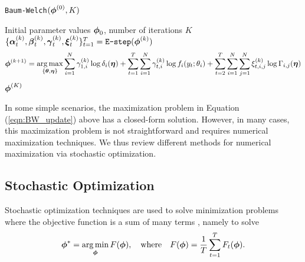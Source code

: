 %
%
%
\begin{algorithm}
\caption{\texttt{Baum-Welch}$(\boldsymbol{\phi}^{(0)},K)$}\label{alg:EM}
\begin{algorithmic}[1]
\Require Initial parameter values $\boldsymbol{\phi}_0$, number of iterations $K$
    \State $\{\boldsymbol{\alpha}_{t}^{(k)},\boldsymbol{\beta}_{t}^{(k)},\boldsymbol{\gamma}_{t}^{(k)},\boldsymbol{\xi}_{t}^{(k)}\}_{t=1}^T = \texttt{E-step}(\boldsymbol{\phi}^{(k)})$  
    \State {} $$\boldsymbol{\phi}^{(k+1)} = \operatorname*{arg\,max}_{\{\boldsymbol{\theta},\boldsymbol{\eta}\}} \sum_{i=1}^N \gamma_{1,i}^{(k)} \log \delta_{i}(\boldsymbol{\eta}) + \sum_{t = 1}^T \sum_{i=1}^N \gamma_{t,i}^{(k)} \log f_{i}(y_t;\theta_{i}) + \sum_{t=2}^{T} \sum_{i=1}^N \sum_{j=1}^N \xi_{t,i,j}^{(k)} \log \Gamma_{i,j}(\boldsymbol{\eta})$$
\EndFor
\State \Return $\boldsymbol{\phi}^{(K)}$
\end{algorithmic}
\end{algorithm}
%
In some simple scenarios, the maximization problem in Equation (\ref{eqn:BW_update}) above has a closed-form solution. %
However, in many cases, this maximization problem is not straightforward and requires numerical maximization techniques. %
We thus review different methods for numerical maximization via stochastic optimization. %

\subsection{Stochastic Optimization}
\label{subsec:stoch_optim}

Stochastic optimization techniques are used to solve minimization problems where the objective function is a sum of many terms \citep{Robbins:1951}, %
namely to solve
%
\begin{equation}
    \boldsymbol{\phi}^* = \operatorname*{arg\,min}_{\boldsymbol{\phi}} F(\boldsymbol{\phi}), \quad \text{where} \quad F(\boldsymbol{\phi}) = \frac{1}{T}\sum_{t = 1}^T F_t(\boldsymbol{\phi}).
    \label{eqn:stoch_opt}
\end{equation}
%

